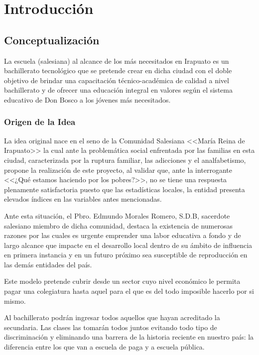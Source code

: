 \chapter{Introducción}

\section{Conceptualización}

La escuela (salesiana) al alcance de los más necesitados en Irapuato es un bachillerato tecnológico que se pretende crear en dicha ciudad con el doble objetivo de brindar una capacitación técnico-académica de calidad a nivel bachillerato y de ofrecer una educación integral en valores según el sistema educativo de Don Bosco a los jóvenes más necesitados.

\subsection{Origen de la Idea}

La idea original nace en el seno de la Comunidad Salesiana <<María Reina de Irapuato>> la cual ante la problemática social enfrentada por las familias en esta ciudad, caracterizada por la ruptura familiar, las adicciones y el analfabetismo, propone la realización de este proyecto, al validar que, ante la interrogante <<¿Qué estamos haciendo por los pobres?>>, no se tiene una respuesta plenamente satisfactoria puesto que las estadísticas locales, la entidad presenta elevados índices en las variables antes mencionadas.\citep{Morales09}

Ante esta situación, el Pbro. Edmundo Morales Romero, S.D.B, sacerdote salesiano miembro de dicha comunidad, destaca la existencia de numerosas razones por las cuales es urgente emprender una labor educativa a fondo y de largo alcance que impacte en el desarrollo local dentro de su ámbito de influencia en primera instancia y en un futuro próximo sea susceptible de reproducción en las demás entidades del país.

Este modelo pretende cubrir desde un sector cuyo nivel económico le permita pagar una colegiatura hasta aquel para el que es del todo imposible hacerlo por si mismo.

Al bachillerato podrán ingresar todos aquellos que hayan acreditado la secundaria. Las clases las tomarán todos juntos evitando todo tipo de discriminación y eliminando una barrera de la historia reciente en nuestro país: la diferencia entre los que van a escuela de paga y a escuela pública.

